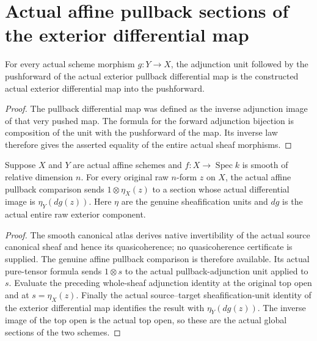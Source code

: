 \section{Actual affine pullback sections of the exterior differential map}

\begin{lemma}\label{sc0-exterior-pullback-sections:adjunction}
\leanok
{}
For every actual scheme morphism $g:Y\to X$, the adjunction unit followed by the pushforward of the actual exterior pullback differential map is the constructed actual exterior differential map into the pushforward.
\end{lemma}
\begin{proof}
The pullback differential map was defined as the inverse adjunction image of that very pushed map. The formula for the forward adjunction bijection is composition of the unit with the pushforward of the map. Its inverse law therefore gives the asserted equality of the entire actual sheaf morphisms.
\end{proof}

\begin{theorem}\label{sc0-exterior-pullback-sections:affine}
\leanok
{}
Suppose $X$ and $Y$ are actual affine schemes and $f:X\to\operatorname{Spec}k$ is smooth of relative dimension $n$. For every original raw $n$-form $z$ on $X$, the actual affine pullback comparison sends $1\otimes\eta_X(z)$ to a section whose actual differential image is $\eta_Y(dg(z))$. Here $\eta$ are the genuine sheafification units and $dg$ is the actual entire raw exterior component.
\end{theorem}
\begin{proof}
The smooth canonical atlas derives native invertibility of the actual source canonical sheaf and hence its quasicoherence; no quasicoherence certificate is supplied. The genuine affine pullback comparison is therefore available. Its actual pure-tensor formula sends $1\otimes s$ to the actual pullback-adjunction unit applied to $s$. Evaluate the preceding whole-sheaf adjunction identity at the original top open and at $s=\eta_X(z)$. Finally the actual source--target sheafification-unit identity of the exterior differential map identifies the result with $\eta_Y(dg(z))$. The inverse image of the top open is the actual top open, so these are the actual global sections of the two schemes.
\end{proof}

